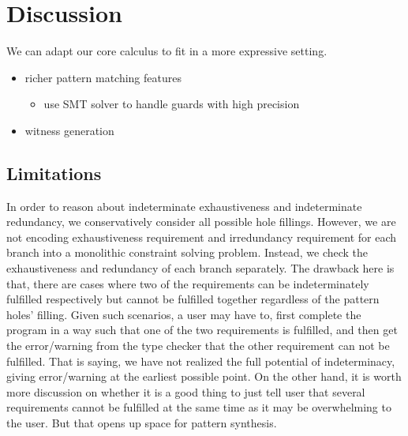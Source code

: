 \section{Discussion}
We can adapt our core calculus to fit in a more expressive setting.

\begin{itemize}
\item richer pattern matching features
\begin{itemize}
    \item \cite{DBLP:journals/corr/abs-1909-04160} use SMT solver to handle guards with high precision
\end{itemize}
\item witness generation
\end{itemize}

\subsection{Limitations}
In order to reason about indeterminate exhaustiveness and indeterminate redundancy, we conservatively consider all possible hole fillings. 
However, we are not encoding exhaustiveness requirement and irredundancy requirement for each branch into a monolithic constraint solving problem. 
Instead, we check the exhaustiveness and redundancy of each branch separately. 
The drawback here is that, there are cases where two of the requirements can be indeterminately fulfilled respectively but cannot be fulfilled together regardless of the pattern holes' filling. Given such scenarios, a user may have to, first complete the program in a way such that one of the two requirements is fulfilled, and then get the error/warning from the type checker that the other requirement can not be fulfilled. That is saying, we have not realized the full potential of indeterminacy, giving error/warning at the earliest possible point. On the other hand, it is worth more discussion on whether it is a good thing to just tell user that several requirements cannot be fulfilled at the same time as it may be overwhelming to the user. But that opens up space for pattern synthesis.